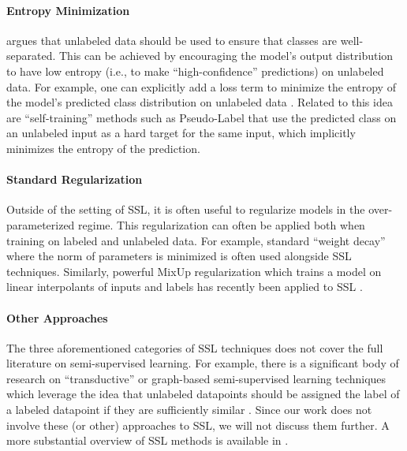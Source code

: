 \documentclass{article} \usepackage{iclr2020_conference,times}
\begin{document}
\paragraph{Entropy Minimization}
\cite{grandvalet2005semi} argues that unlabeled data should be used to ensure that classes are well-separated.
This can be achieved by encouraging the model's output distribution to have low entropy (i.e., to make ``high-confidence'' predictions) on unlabeled data.
For example, one can explicitly add a loss term to minimize the entropy of the model's predicted class distribution on unlabeled data \citep{grandvalet2005semi,miyato2018virtual}.
Related to this idea are ``self-training'' methods \citep{mclachlan1975iterative,rosenberg2005semi} such as Pseudo-Label \citep{lee2013pseudo} that use the predicted class on an unlabeled input as a hard target for the same input, which implicitly minimizes the entropy of the prediction.

\paragraph{Standard Regularization}
Outside of the setting of SSL, it is often useful to regularize models in the over-parameterized regime.
This regularization can often be applied both when training on labeled and unlabeled data.
For example, standard ``weight decay'' \citep{hinton1993keeping} where the  norm of parameters is minimized is often used alongside SSL techniques.
Similarly, powerful MixUp regularization \citep{zhang2017mixup} which trains a model on linear interpolants of inputs and labels has recently been applied to SSL \citep{berthelot2019mixmatch,verma2019interpolation}.

\paragraph{Other Approaches}
The three aforementioned categories of SSL techniques does not cover the full literature on semi-supervised learning.
For example, there is a significant body of research on ``transductive'' or graph-based semi-supervised learning techniques which leverage the idea that unlabeled datapoints should be assigned the label of a labeled datapoint if they are sufficiently similar \citep{gammerman1998learning,joachims2003transductive,joachims1999transductive,bengio2006label,liu2018deep}.
Since our work does not involve these (or other) approaches to SSL, we will not discuss them further.
A more substantial overview of SSL methods is available in \citep{chapelle2006semi}.
\end{document}
